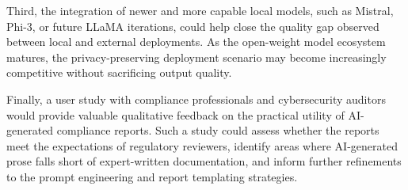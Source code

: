 \documentclass[]{UCD_CS_FYP_Report}
\begin{document}
Third, the integration of newer and more capable local models, such as Mistral, Phi-3, or future LLaMA iterations, could help close the quality gap observed between local and external deployments. As the open-weight model ecosystem matures, the privacy-preserving deployment scenario may become increasingly competitive without sacrificing output quality.

Finally, a user study with compliance professionals and cybersecurity auditors would provide valuable qualitative feedback on the practical utility of AI-generated compliance reports. Such a study could assess whether the reports meet the expectations of regulatory reviewers, identify areas where AI-generated prose falls short of expert-written documentation, and inform further refinements to the prompt engineering and report templating strategies.




\printbibliography


\end{document}
